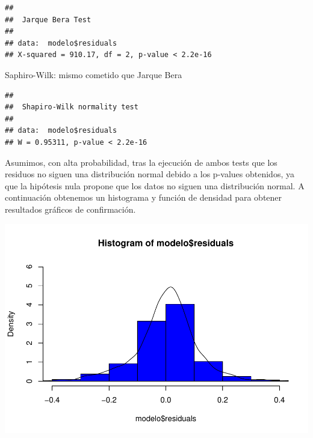 \documentclass[]{article}
\newenvironment{Shaded}{\begin{snugshade}}{\end{snugshade}}
\newcommand{\KeywordTok}[1]{\textcolor[rgb]{0.13,0.29,0.53}{\textbf{#1}}}
\newcommand{\DataTypeTok}[1]{\textcolor[rgb]{0.13,0.29,0.53}{#1}}
\newcommand{\DecValTok}[1]{\textcolor[rgb]{0.00,0.00,0.81}{#1}}
\newcommand{\FloatTok}[1]{\textcolor[rgb]{0.00,0.00,0.81}{#1}}
\newcommand{\StringTok}[1]{\textcolor[rgb]{0.31,0.60,0.02}{#1}}
\newcommand{\OperatorTok}[1]{\textcolor[rgb]{0.81,0.36,0.00}{\textbf{#1}}}
\newcommand{\NormalTok}[1]{#1}
\begin{document}
\begin{verbatim}
## 
##  Jarque Bera Test
## 
## data:  modelo$residuals
## X-squared = 910.17, df = 2, p-value < 2.2e-16
\end{verbatim}

Saphiro-Wilk: mismo cometido que Jarque Bera

\begin{Shaded}
\end{Shaded}

\begin{verbatim}
## 
##  Shapiro-Wilk normality test
## 
## data:  modelo$residuals
## W = 0.95311, p-value < 2.2e-16
\end{verbatim}

Asumimos, con alta probabilidad, tras la ejecución de ambos tests que
los residuos no siguen una distribución normal debido a los p-values
obtenidos, ya que la hipótesis nula propone que los datos no siguen una
distribución normal. A continuación obtenemos un histograma y función de
densidad para obtener resultados gráficos de confirmación.

\begin{Shaded}
\end{Shaded}

\includegraphics{timeSeries_files/figure-latex/unnamed-chunk-65-1.pdf}
\end{document}
